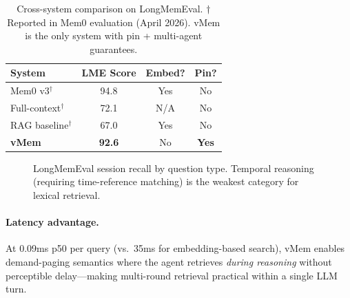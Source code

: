 \documentclass[10pt,twocolumn]{article}
\begin{document}
\begin{table}[t]
\centering
\caption{Cross-system comparison on LongMemEval. $\dagger$Reported in Mem0 evaluation (April 2026). vMem is the only system with pin + multi-agent guarantees.}
\label{tab:comparison}
\footnotesize
\begin{tabular}{lccc}
\toprule
System & LME Score & Embed? & Pin? \\
\midrule
Mem0 v3$^\dagger$      & 94.8 & Yes & No \\
Full-context$^\dagger$ & 72.1 & N/A & No \\
RAG baseline$^\dagger$ & 67.0 & Yes & No \\
\midrule
\textbf{vMem}   & \textbf{92.6} & No & \textbf{Yes} \\
\bottomrule
\end{tabular}
\end{table}

\begin{figure}[t]
\centering
{}
\caption{LongMemEval session recall by question type. Temporal reasoning (requiring time-reference matching) is the weakest category for lexical retrieval.}
\label{fig:lme_results}
\end{figure}

\paragraph{Latency advantage.} At 0.09ms p50 per query (vs.\ 35ms for embedding-based search), vMem enables demand-paging semantics where the agent retrieves \emph{during reasoning} without perceptible delay---making multi-round retrieval practical within a single LLM turn.
\end{document}
